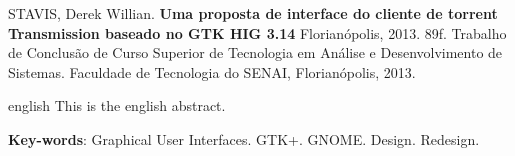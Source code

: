 \noindent
STAVIS, Derek Willian. \textbf{Uma proposta de interface do cliente de torrent Transmission baseado no GTK HIG 3.14}
Florianópolis, 2013. 89f. Trabalho de Conclusão de Curso Superior de Tecnologia 
em Análise e Desenvolvimento de Sistemas. Faculdade de Tecnologia do SENAI,
Florianópolis, 2013.

\vspace{1cm}
\begin{resumo}
 \begin{otherlanguage*}{english}
   This is the english abstract.

   \vspace{\onelineskip}
 
   \noindent 
   \textbf{Key-words}: Graphical User Interfaces. GTK+. GNOME. Design. Redesign.
 \end{otherlanguage*}
\end{resumo}

